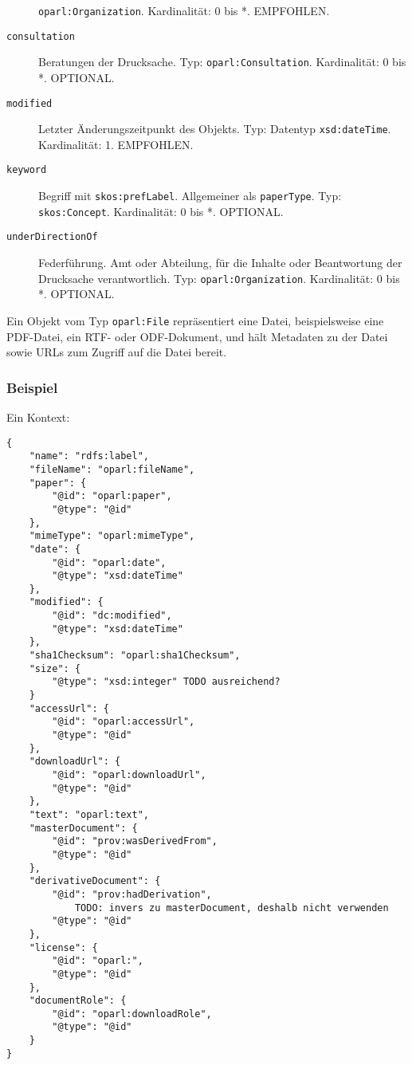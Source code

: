 \documentclass[,a4paper]{article}
\begin{document}
\begin{description}
\texttt{oparl:Organization}. Kardinalität: 0 bis *. EMPFOHLEN.
\item[\texttt{consultation}]
Beratungen der Drucksache. Typ: \texttt{oparl:Consultation}.
Kardinalität: 0 bis *. OPTIONAL.
\item[\texttt{modified}]
Letzter Änderungszeitpunkt des Objekts. Typ: Datentyp
\texttt{xsd:dateTime}. Kardinalität: 1. EMPFOHLEN.
\item[\texttt{keyword}]
Begriff mit \texttt{skos:prefLabel}. Allgemeiner als \texttt{paperType}.
Typ: \texttt{skos:Concept}. Kardinalität: 0 bis *. OPTIONAL.
\item[\texttt{underDirectionOf}]
Federführung. Amt oder Abteilung, für die Inhalte oder Beantwortung der
Drucksache verantwortlich. Typ: \texttt{oparl:Organization}.
Kardinalität: 0 bis *. OPTIONAL.
\end{description}


Ein Objekt vom Typ \texttt{oparl:File} repräsentiert eine Datei,
beispielsweise eine PDF-Datei, ein RTF- oder ODF-Dokument, und hält
Metadaten zu der Datei sowie URLs zum Zugriff auf die Datei bereit.

\subsubsection{Beispiel}\label{beispiel-7}

Ein Kontext:

\begin{verbatim}
{
    "name": "rdfs:label",
    "fileName": "oparl:fileName",
    "paper": {
        "@id": "oparl:paper",
        "@type": "@id"
    },
    "mimeType": "oparl:mimeType",
    "date": {
        "@id": "oparl:date",
        "@type": "xsd:dateTime"
    },
    "modified": {
        "@id": "dc:modified",
        "@type": "xsd:dateTime"
    },
    "sha1Checksum": "oparl:sha1Checksum",
    "size": {
        "@type": "xsd:integer" TODO ausreichend?
    }
    "accessUrl": {
        "@id": "oparl:accessUrl",
        "@type": "@id"
    },
    "downloadUrl": {
        "@id": "oparl:downloadUrl",
        "@type": "@id"
    },
    "text": "oparl:text",
    "masterDocument": {
        "@id": "prov:wasDerivedFrom",
        "@type": "@id"
    },
    "derivativeDocument": {
        "@id": "prov:hadDerivation",
            TODO: invers zu masterDocument, deshalb nicht verwenden
        "@type": "@id"
    },  
    "license": {
        "@id": "oparl:",
        "@type": "@id"
    },
    "documentRole": {
        "@id": "oparl:downloadRole",
        "@type": "@id"
    }
}
\end{verbatim}
\end{document}
